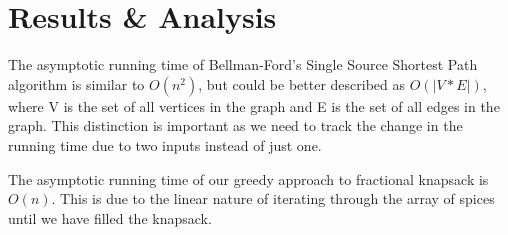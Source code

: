\documentclass[letterpaper, 10pt]{article}
\begin{document}
\section{Results \& Analysis}

\hspace{1.0em}The asymptotic running time of Bellman-Ford's Single Source Shortest Path algorithm is similar to $O(n^2)$, but could be better described as $O(|V*E|)$, where V is the set of all vertices in the graph and E is the set of all edges in the graph. This distinction is important as we need to track the change in the running time due to two inputs instead of just one.

\hspace{1.0em}The asymptotic running time of our greedy approach to fractional knapsack is $O(n)$. This is due to the linear nature of iterating through the array of spices until we have filled the knapsack.
\end{document}
